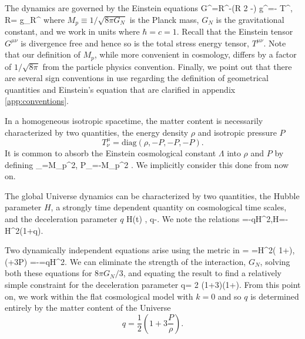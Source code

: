 The dynamics are governed by the Einstein equations
\beqn\label{Einstine}
G^{\mu\nu}=R^{\mu\nu}-\left(\frac R 2 -\Lambda\right) g^{\mu\nu}=- T^{\mu\nu},  
\quad R= g_{\mu\nu}R^{\mu\nu}
\eeqn
where $M_p\equiv 1/\sqrt{8\pi G_N}$ is the Planck mass, $G_N$ is the gravitational constant, and we work in units where $\hbar=c=1$. Recall that the Einstein tensor $G^{\mu\nu}$ is divergence free and hence so is the total stress energy tensor, $T^{\mu\nu}$.  Note that our definition of $M_p$, while more convenient in cosmology, differs by a factor of $1/\sqrt{8\pi}$ from the particle physics convention.  Finally, we point out that there are several sign conventions in use regarding the definition of geometrical quantities and Einstein's equation that are clarified in appendix \ref{app:conventions}.

 In a homogeneous isotropic spacetime, the matter content is necessarily characterized by two quantities, the energy density $\rho$ and isotropic pressure $P$
\begin{equation}
  T^\mu_\nu =\mathrm{diag}(\rho, -P, -P, -P).
\end{equation}
 It is common to absorb the Einstein cosmological constant $\Lambda$ into $\rho$ and $P$ by defining
\beqn\label{EpsLam}
\rho_\Lambda=M_p^2\Lambda, \qquad P_\Lambda=-M_p^2 \Lambda.
\eeqn
We implicitly consider this done from now on. 


The global Universe dynamics can be characterized by two  quantities, the Hubble parameter  $H$, a strongly time dependent quantity on cosmological time scales,  and the deceleration parameter $q$
\beqn\label{dynamic}
\equiv H(t) ,\quad 
q\equiv -.
\eeqn
We note the relations
\beqn
\quad {}=-qH^2,\quad \dot H=-H^2(1+q). 
\eeqn

Two dynamically independent equations arise using the metric  in 
\beqn\label{hubble}
 \rho =  
=H^2\left( 1+\right),
\qquad
{} (\rho+3P)  =-=qH^2.
\eeqn
We can eliminate the strength of the interaction, $G_N$,  solving both these equations for ${8\pi G_N}/{3}$, and equating the result to find a relatively simple constraint for the deceleration parameter
\beqn\label{qparam}
q= 2 \left(1+3\right)\left(1+\right).
\eeqn
 From this point on, we work within the  flat cosmological model with $k=0$ and so $q$ is determined entirely by the matter content of the Universe
\begin{equation}\label{qparam}
q=\frac 1 2 \left(1+3\frac{P}{\rho}\right).
\end{equation}


